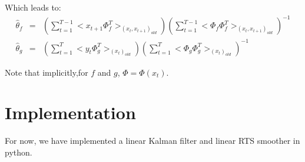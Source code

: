 \documentclass[11pt, oneside]{amsart}
\begin{document}
Which leads to:
\begin{eqnarray}
\hat{\theta}_f&=&(\sum_{t=1}^{T-1}{<x_{t+1}\Phi_f^T >_{(x_t,x_{t+1})_{old}}})(\sum_{t=1}^{T-1}{<\Phi_f\Phi_f^T >_{(x_t,x_{t+1})_{old}}})^{-1}\\
\hat{\theta}_g&=&(\sum_{t=1}^{T}{<y_{t}\Phi_g^T >_{(x_t)_{old}}})(\sum_{t=1}^{T}{<\Phi_g\Phi_g^T >_{(x_t)_{old}}})^{-1}
\end{eqnarray}

Note that implicitly,for $f$ and $g$, $\Phi=\Phi(x_t)$.

\section{Implementation}

For now, we have implemented a linear Kalman filter and linear RTS smoother in python. 
\end{document}
